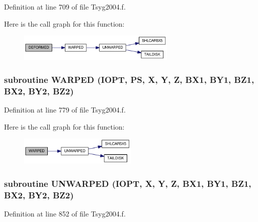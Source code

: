 Definition at line 709 of file Tsyg2004.f.

Here is the call graph for this function:\nopagebreak
\begin{figure}[H]
\begin{center}
\leavevmode
\includegraphics[width=213pt]{_tsyg2004_8f_62fcead2ce484cd76fdc162bd2e72ca3_cgraph}
\end{center}
\end{figure}
\hypertarget{_tsyg2004_8f_25094ad80471178e624b89c840009cc6}{
\subsubsection[{WARPED}]{\setlength{\rightskip}{0pt plus 5cm}subroutine WARPED (IOPT, \/  PS, \/  X, \/  Y, \/  Z, \/  BX1, \/  BY1, \/  BZ1, \/  BX2, \/  BY2, \/  BZ2)}}
\label{_tsyg2004_8f_25094ad80471178e624b89c840009cc6}




Definition at line 779 of file Tsyg2004.f.

Here is the call graph for this function:\nopagebreak
\begin{figure}[H]
\begin{center}
\leavevmode
\includegraphics[width=159pt]{_tsyg2004_8f_25094ad80471178e624b89c840009cc6_cgraph}
\end{center}
\end{figure}
\hypertarget{_tsyg2004_8f_08d1be0e49f67539068d7f8dd74b4b9e}{
\subsubsection[{UNWARPED}]{\setlength{\rightskip}{0pt plus 5cm}subroutine UNWARPED (IOPT, \/  X, \/  Y, \/  Z, \/  BX1, \/  BY1, \/  BZ1, \/  BX2, \/  BY2, \/  BZ2)}}
\label{_tsyg2004_8f_08d1be0e49f67539068d7f8dd74b4b9e}




Definition at line 852 of file Tsyg2004.f.

